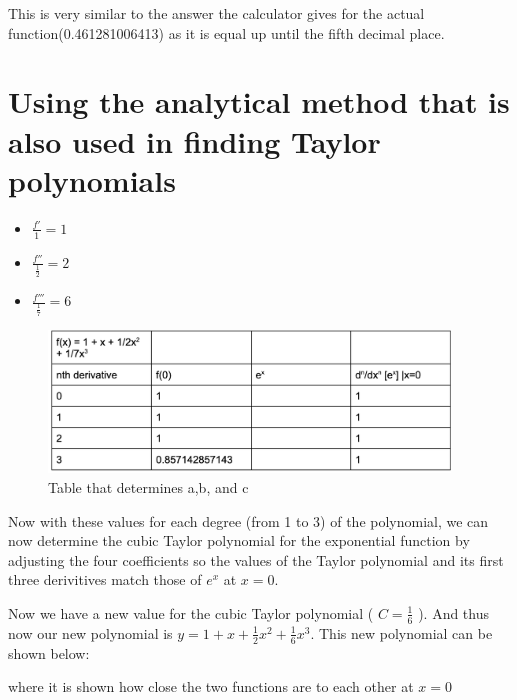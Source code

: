 \documentclass{report}
\begin{document}
This is very similar to the answer the calculator gives for the actual function(0.461281006413) as it is equal up until the fifth decimal place.

\section{Using the analytical method that is also used in finding Taylor polynomials}

\begin{itemize}
  \item $\frac{f'}{1} = 1 $
  \item $\frac{f''}{\frac{1}{2}} = 2$
  \item $\frac{f'''}{\frac{1}{7}} = 6$
\end{itemize}

\begin{figure}
  \begin{center}
    \includegraphics[width=0.95\textwidth]{figures/image.png}
  \end{center}
  \caption{Table that determines a,b, and c}
  \label{fig:}
\end{figure}



Now with these values for each degree (from 1 to 3) of the polynomial, we can now determine the cubic Taylor polynomial for the exponential function by adjusting the four coefficients so the values of the Taylor polynomial and its first three derivitives match those of $e^x$ at $x=0$.

Now we have a new value for the cubic Taylor polynomial ( $ C = \frac{1}{6} $ ). And thus now our new polynomial is $ y = 1 + x + \frac{1}{2}x^2 + \frac{1}{6}x^3 $. This new polynomial can be shown below:

where it is shown how close the two functions are to each other at $ x = 0 $
\end{document}
